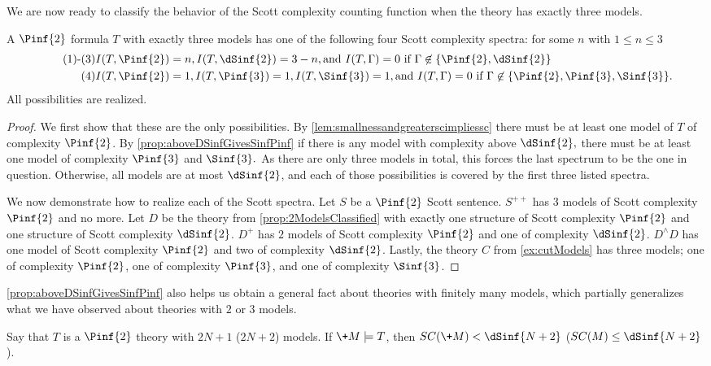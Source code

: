 \documentclass[10pt,a4paper]{amsart}
\renewcommand{\-}{\text{-}}
\begin{document}
We are now ready to classify the behavior of the Scott complexity counting function when the theory has exactly three models.

\begin{proposition}
A $\Pinf{2}$ formula $T$ with exactly three models has one of the following four Scott complexity spectra:
for some $n$ with $1\leq n\leq3$
\begin{align} \tag*{(1)-(3)}&I(T,\Pinf{2})=n,  I(T,\dSinf{2})=3-n, \text{and }  I(T,\Gamma)=0 \text{ if $\Gamma\not\in \{\Pinf{2}, \dSinf{2}\}$}\\
\tag{4}&I(T,\Pinf{2})=1,  I(T,\Pinf{3})=1,  I(T,\Sinf{3})=1,\text{and }  I(T,\Gamma)=0 \text{ if $\Gamma\not\in \{ \Pinf{2},\Pinf{3},\Sinf{3}\}$.}\end{align}
All possibilities are realized.
\end{proposition}

\begin{proof}
We first show that these are the only possibilities.
By \cref{lem:smallnessandgreaterscimpliessc} there must be at least one model of $T$ of complexity $\Pinf{2}$.
By \cref{prop:aboveDSinfGivesSinfPinf} if there is any model with complexity above $\dSinf{2},$ there must be at least one model of complexity $\Pinf{3}$ and $\Sinf{3}.$
As there are only three models in total, this forces the last spectrum to be the one in question.
Otherwise, all models are at most $\dSinf{2}$, and each of those possibilities is covered by the first three listed spectra.

We now demonstrate how to realize each of the Scott spectra.
Let $S$ be a $\Pinf{2}$ Scott sentence.
$S^{++}$ has $3$ models of Scott complexity $\Pinf{2}$ and no more.
Let $D$ be the theory from \cref{prop:2ModelsClassified} with exactly one structure of Scott complexity $\Pinf{2}$ and one structure of Scott complexity $\dSinf{2}$.
$D^+$ has $2$ models of Scott complexity $\Pinf{2}$ and one of complexity $\dSinf{2}$.
$D^\wedge D$ has one model of Scott complexity $\Pinf{2}$ and two of complexity $\dSinf{2}$.
Lastly, the theory $C$ from \cref{ex:cutModels} has three models; one of complexity $\Pinf{2}$, one of complexity $\Pinf{3}$, and one of complexity $\Sinf{3}$.
\end{proof}

\cref{prop:aboveDSinfGivesSinfPinf} also helps us obtain a general fact about theories with finitely many models, which partially generalizes what we have observed about theories with $2$ or $3$ models.

\begin{proposition}\label{prop:finiteHeight}
Say that $T$ is a $\Pinf{2}$ theory with $2N+1$ ($2N+2$) models.
If $\+M\models T$, then $SC(\+M)<\dSinf{N+2}$ ($SC(M)\leq\dSinf{N+2}$).
\end{proposition}
\end{document}
